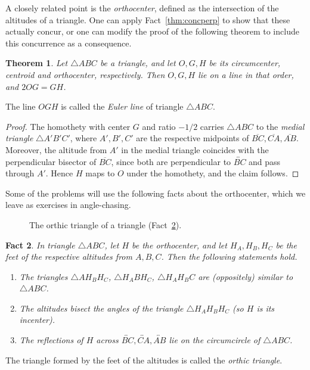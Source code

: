 \documentclass[12pt]{book}
\numberwithin{exc}{section}
\numberwithin{figure}{section}
\newtheorem{theorem}{Theorem}[section]
\newtheorem{fact}[theorem]{Fact}
\numberwithin{equation}{theorem}
\def\ii{\item}
\def\line#1{\overleftrightarrow{#1}}
\def\seg#1{\overline{#1}}
\begin{document}
A closely related point is the \emph{orthocenter}, defined as the 
intersection of the altitudes of a triangle. One can apply
Fact~\ref{thm:concperp}
to show that these actually concur, or one can modify the proof of 
the following theorem to include this concurrence as a consequence.
\begin{theorem}
Let $\triangle ABC$ be a triangle, and let $O,G,H$ be
its circumcenter, centroid and 
orthocenter, respectively. Then $O,G,H$ lie on a line in that order, and 
$2OG = GH$.
\end{theorem}
The line $OGH$ is called the \emph{Euler line} of triangle $\triangle ABC$.
\begin{proof}
The homothety with center $G$ and ratio $-1/2$ carries $\triangle ABC$ 
to the \emph{medial triangle} 
$\triangle A'B'C'$, where $A', B', C'$ are the respective midpoints of
$\seg{BC}, \seg{CA}, \seg{AB}$.
Moreover, the altitude from $A'$ in the medial triangle coincides 
with the perpendicular bisector of $\seg{BC}$, since both are
perpendicular to $\line{BC}$ and pass through $A'$.
Hence $H$ maps to $O$ under the homothety, and the claim follows.
\end{proof}

Some of the problems will use the following facts about the 
orthocenter, which we leave as exercises in angle-chasing. 
\begin{figure}[ht]
\caption{The orthic triangle of a triangle (Fact~\ref{fact:orthic}).}
\end{figure}

\begin{fact} \label{fact:orthic}
In triangle $\triangle ABC$,
let $H$ be the orthocenter, and
let $H_{A}, H_{B}, H_{C}$ be the feet of the respective
altitudes from $A,B,C$.
Then the following statements hold.
\begin{enumerate}
\ii
The triangles $\triangle AH_{B}H_{C}$, $\triangle H_{A}BH_{C}$, 
$\triangle H_{A}H_{B}C$ are (oppositely) similar to $\triangle ABC$.
\ii
The altitudes bisect the angles of the triangle $\triangle 
H_{A}H_{B}H_{C}$ (so $H$ is its incenter).
\ii
The reflections of $H$ across $\line{BC}, \line{CA}, \line{AB}$ 
lie on the circumcircle of
$\triangle ABC$.
\end{enumerate}
\end{fact}
The triangle formed by the feet of the altitudes is called the 
\emph{orthic triangle}.
\end{document}

